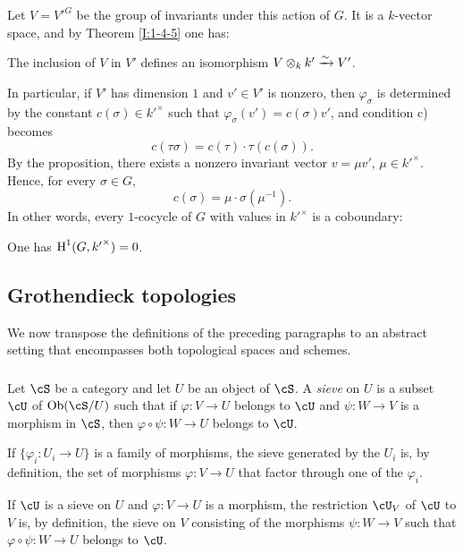 Let $V={V'}^G$ be the group of invariants under this action of $G$. It
is a $k$-vector space, and by Theorem \ref{I:1-4-5} one has:

\begin{proposition}\label{I:1-5-2}
The inclusion of $V$ in $V'$ defines an isomorphism
$V\otimes_k k'\xrightarrow\sim V'$.
\end{proposition}

In particular, if $V'$ has dimension $1$ and $v'\in V'$ is nonzero, then
$\varphi_\sigma$ is determined by the constant
$c(\sigma)\in {k'}^\times$ such that
$\varphi_\sigma(v')=c(\sigma)v'$, and condition c) becomes
\[
  c(\tau\sigma) = c(\tau)\cdot \tau(c(\sigma))\text{.}
\]
By the proposition, there exists a nonzero invariant vector
$v=\mu v'$, $\mu\in {k'}^\times$. Hence, for every $\sigma\in G$,
\[
  c(\sigma) = \mu\cdot \sigma(\mu^{-1})\text{.}
\]
In other words, every $1$-cocycle of $G$ with values in
${k'}^\times$ is a coboundary:

\begin{corollary}\label{I:1-5-3}
One has $\operatorname{H}^1(G,{k'}^\times)=0$.
\end{corollary}

\subsection{Grothendieck topologies}\label{I:1-6}

We now transpose the definitions of the preceding paragraphs to an
abstract setting that encompasses both topological spaces and schemes.

\subsubsection{}\label{I:1-6-1}

Let $\cS$ be a category and let $U$ be an object of $\cS$. A
\emph{sieve} on $U$ is a subset $\cU$ of $\ob(\cS/U)$ such that if
$\varphi:V\to U$ belongs to $\cU$ and $\psi:W\to V$ is a morphism in
$\cS$, then $\varphi\circ\psi:W\to U$ belongs to $\cU$.

If $\{\varphi_i:U_i\to U\}$ is a family of morphisms, the sieve generated
by the $U_i$ is, by definition, the set of morphisms $\varphi:V\to U$
that factor through one of the $\varphi_i$.

If $\cU$ is a sieve on $U$ and $\varphi:V\to U$ is a morphism, the
restriction $\cU_V$ of $\cU$ to $V$ is, by definition, the sieve on
$V$ consisting of the morphisms $\psi:W\to V$ such that
$\varphi\circ\psi:W\to U$ belongs to $\cU$.

